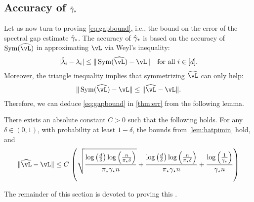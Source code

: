 
\subsection{Accuracy of $\hat\gamma_{\star}$}

Let us now turn to proving \cref{eq:gapbound}, i.e., 
the bound on the error of the spectral gap estimate $\hat\gamma_{\star}$.
The accuracy of $\hat\gamma_{\star}$ is based on the accuracy of $\Sym(\wh\vL)$
in approximating $\vL$ via Weyl's inequality:
\begin{align*}%
  |\hat\lambda_i - \lambda_i|
  \leq \norm{\Sym(\wh\vL) - \vL}
  \quad \text{for all }i \in [d] .
\end{align*}
Moreover, the triangle inequality implies that symmetrizing $\wh\vL$
can only help:
\begin{align*}
  \norm{\Sym(\wh\vL) - \vL} \leq \norm{\wh\vL - \vL} .
\end{align*}
Therefore, we can deduce \cref{eq:gapbound} in \cref{thm:err} from the
following lemma.
\begin{lemma}
  \label{lem:gap}
  There exists an absolute constant $C>0$ such that the following
  holds.
  For any $\delta \in (0,1)$, with probability at least $1-\delta$,
  the bounds from \cref{lem:hatpimin} hold, and
  \begin{equation*}
    \norm{\wh\vL - \vL}
    \leq
    C\,
    \Parens{
      \sqrt{
        \frac{
          \log\Parens{\frac{d}{\delta}}
          \log\Parens{\frac{n}{\pimin\delta}}
        }{\pimin\gap n}
      }
      +
      \frac{
        \log\Parens{\frac{d}{\delta}}
        \log\Parens{\frac{n}{\pimin\delta}}
      }{\pimin\gap n}
      +
      \frac{\log\Parens{\frac{1}{\gap}}}{\gap n}
    }
  \end{equation*}
\end{lemma}
The remainder of this section is devoted to proving this
.

